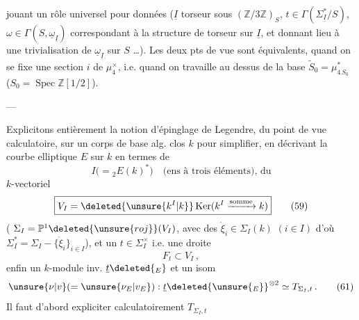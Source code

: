 jouant un rôle universel pour   données ($\underline I$ torseur sous $(\mathbb Z/3\mathbb Z)_S$, $t\in\Gamma(\Sigma^*_{\underline I}/S)$, $\omega\in\Gamma(S,\underline\omega_{\underline I})$ correspondant à la structure de torseur sur $\underline I$, et donnant lieu à une trivialisation de $\underline\omega_{\underline I}$ sur $S$ \ldots). Les deux pts de vue sont équivalents, quand on se fixe une section $i$ de $\mu_4^\times$, i.e. quand on travaille au dessus de la base $\widetilde S_0=\mu_{4\,S_0}^*$ ($S_0=\operatorname{Spec}\mathbb Z[1/2]$).

\begin{center}---\end{center}

Explicitons entièrement la notion d'épinglage de Legendre, du point de vue calculatoire, sur un corps de base alg. clos $k$ pour simplifier, en décrivant la courbe elliptique $E$ sur $k$ en termes de
\[
\boxed{I\bigl(={}_2E(k)^*\bigr)}\quad\text{(ens à trois éléments), du} \tag*{(58)}
\]
$k$-vectoriel
\[
\boxed{V_I=\deleted{\unsure{k^I|k}}\operatorname{Ker}(k^I\xrightarrow{\text{somme}}k)} \tag*{(59)}
\]
( $\Sigma_I=\mathbb P^1\deleted{\unsure{roj}}(V_I)$, avec  des $\dot\xi_i\in\Sigma_I(k)$ $(i\in I)$ d'où $\Sigma_I^*=\Sigma_I-\{\dot\xi_i\}_{i\in I}$), et un $t\in\Sigma_I^\times$ i.e. une droite
\[
F_t\subset V_I\,, \tag*{(60)}
\]
enfin un $k$-module inv. $\underline t\deleted{_E}$  et un isom
\[
\unsure{\nu|v}(=\unsure{\nu_E|v_E}):\underline t\deleted{\unsure{_E}}^{\otimes2}\simeq T_{\Sigma_I,t}\,. \tag*{(61)}
\]
Il faut d'abord expliciter calculatoirement $T_{\Sigma_I,t}$
